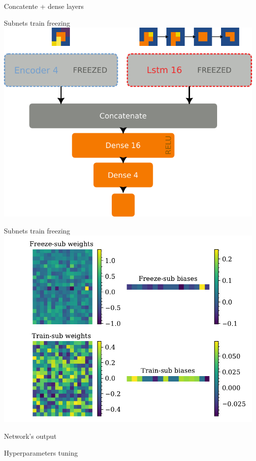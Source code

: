 \documentclass{beamer}
\begin{document}
\begin{frame}{Concatente + dense layers}

    
\end{frame}


\begin{frame}{Subnets train freezing}
    \includegraphics[width=.8\linewidth]{freezetraining_2.pdf}
\end{frame}

\begin{frame}{Subnets train freezing}
    \includegraphics[width=.8\linewidth]{freezetraining.pdf}
\end{frame}

\begin{frame}{Network's output}

    
\end{frame}

\begin{frame}{Hyperparameters tuning}

    
\end{frame}
\end{document}
